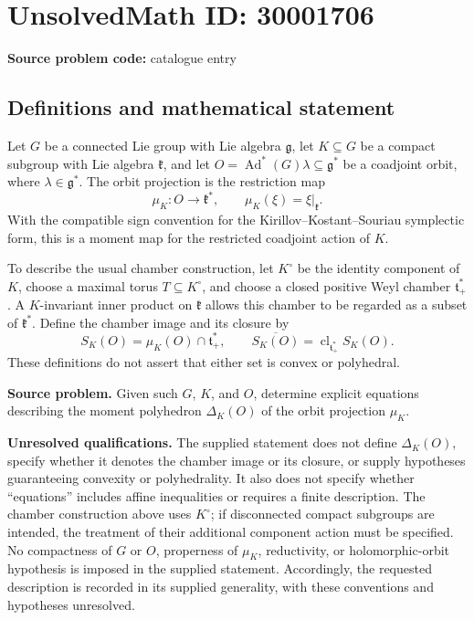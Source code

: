 \documentclass[11pt]{article}
\begin{document}
\section*{UnsolvedMath ID: 30001706}
\textbf{Source problem code:} catalogue entry
\subsection{Definitions and mathematical statement}
Let \(G\) be a connected Lie group with Lie algebra \(\mathfrak g\), let \(K\subseteq G\) be a compact subgroup with Lie algebra \(\mathfrak k\), and let \(O=\operatorname{Ad}^{*}(G)\lambda\subseteq\mathfrak g^{*}\) be a coadjoint orbit, where \(\lambda\in\mathfrak g^{*}\). The orbit projection is the restriction map
\[
\mu_K:O\longrightarrow\mathfrak k^{*},\qquad
\mu_K(\xi)=\xi|_{\mathfrak k}.
\]
With the compatible sign convention for the Kirillov--Kostant--Souriau symplectic form, this is a moment map for the restricted coadjoint action of \(K\).

To describe the usual chamber construction, let \(K^{\circ}\) be the identity component of \(K\), choose a maximal torus \(T\subseteq K^{\circ}\), and choose a closed positive Weyl chamber \(\mathfrak t^{*}_{+}\). A \(K\)-invariant inner product on \(\mathfrak k\) allows this chamber to be regarded as a subset of \(\mathfrak k^{*}\). Define the chamber image and its closure by
\[
S_K(O)=\mu_K(O)\cap\mathfrak t^{*}_{+},\qquad
\overline{S_K(O)}=\operatorname{cl}_{\mathfrak t^{*}_{+}}S_K(O).
\]
These definitions do not assert that either set is convex or polyhedral.

\textbf{Source problem.} Given such \(G\), \(K\), and \(O\), determine explicit equations describing the moment polyhedron \(\Delta_K(O)\) of the orbit projection \(\mu_K\).

\textbf{Unresolved qualifications.} The supplied statement does not define \(\Delta_K(O)\), specify whether it denotes the chamber image or its closure, or supply hypotheses guaranteeing convexity or polyhedrality. It also does not specify whether ``equations'' includes affine inequalities or requires a finite description. The chamber construction above uses \(K^{\circ}\); if disconnected compact subgroups are intended, the treatment of their additional component action must be specified. No compactness of \(G\) or \(O\), properness of \(\mu_K\), reductivity, or holomorphic-orbit hypothesis is imposed in the supplied statement. Accordingly, the requested description is recorded in its supplied generality, with these conventions and hypotheses unresolved.
\end{document}
